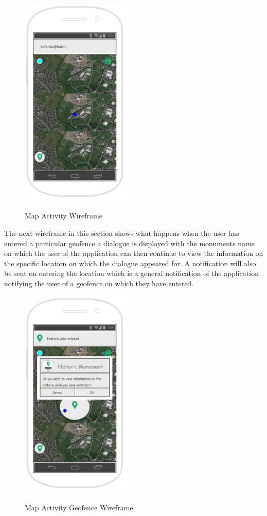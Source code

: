 \begin{figure}[htbp]
    \center \includegraphics[width=150pt]{MapActivityWireframe}\\
    \caption{Map Activity Wireframe} \label{Figure: Map Activity Wireframe}
\end{figure}

\par
The next wireframe in this section shows what happens when the user has entered a particular geofence a dialogue is displayed with the monuments name on which the user of the application can then continue to view the information on the specific location on which the dialogue appeared for. A notification will also be sent on entering the location which is a general notification of the application notifying the user of a geofence on which they have entered.

\begin{figure}[htbp]
    \center \includegraphics[width=150pt]{GeofenceMapWireframe}\\
    \caption{Map Activity Geofence Wireframe} \label{Figure: Map Activity Geofence Wireframe}
\end{figure}

